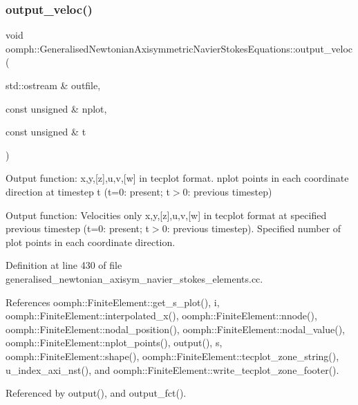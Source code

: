 \subsubsection{\texorpdfstring{output\+\_\+veloc()}{output\_veloc()}}
{\footnotesize\ttfamily void oomph\+::\+Generalised\+Newtonian\+Axisymmetric\+Navier\+Stokes\+Equations\+::output\+\_\+veloc (\begin{DoxyParamCaption}\item[{std\+::ostream \&}]{outfile,  }\item[{const unsigned \&}]{nplot,  }\item[{const unsigned \&}]{t }\end{DoxyParamCaption})}



Output function\+: x,y,\mbox{[}z\mbox{]},u,v,\mbox{[}w\mbox{]} in tecplot format. nplot points in each coordinate direction at timestep t (t=0\+: present; t$>$0\+: previous timestep) 

Output function\+: Velocities only x,y,\mbox{[}z\mbox{]},u,v,\mbox{[}w\mbox{]} in tecplot format at specified previous timestep (t=0\+: present; t$>$0\+: previous timestep). Specified number of plot points in each coordinate direction. 

Definition at line 430 of file generalised\+\_\+newtonian\+\_\+axisym\+\_\+navier\+\_\+stokes\+\_\+elements.\+cc.



References oomph\+::\+Finite\+Element\+::get\+\_\+s\+\_\+plot(), i, oomph\+::\+Finite\+Element\+::interpolated\+\_\+x(), oomph\+::\+Finite\+Element\+::nnode(), oomph\+::\+Finite\+Element\+::nodal\+\_\+position(), oomph\+::\+Finite\+Element\+::nodal\+\_\+value(), oomph\+::\+Finite\+Element\+::nplot\+\_\+points(), output(), s, oomph\+::\+Finite\+Element\+::shape(), oomph\+::\+Finite\+Element\+::tecplot\+\_\+zone\+\_\+string(), u\+\_\+index\+\_\+axi\+\_\+nst(), and oomph\+::\+Finite\+Element\+::write\+\_\+tecplot\+\_\+zone\+\_\+footer().



Referenced by output(), and output\+\_\+fct().

\mbox{\label{classoomph_1_1GeneralisedNewtonianAxisymmetricNavierStokesEquations_ac0498239daebac18dd5edc754a8799f9}} 
